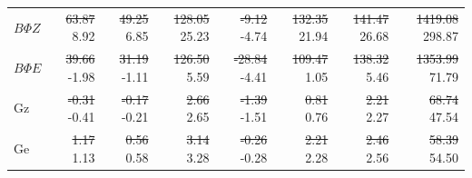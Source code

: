 \documentclass[pdflatex,sn-chicago]{sn-jnl}%
\makeatletter
\theoremstyle{plain}
\theoremstyle{definition}
\theoremstyle{remark}
\theoremstyle{definition}
\providecommand{\DIFaddtex}[1]{{\protect\color{blue}#1}} %
\providecommand{\DIFdeltex}[1]{{\protect\color{red}\sout{#1}}} %
\providecommand{\DIFaddFL}[1]{\DIFadd{#1}} %
\providecommand{\DIFdelFL}[1]{\DIFdel{#1}} %
\providecommand{\DIFaddbeginFL}{} %
\providecommand{\DIFaddendFL}{} %
\providecommand{\DIFdelbeginFL}{} %
\providecommand{\DIFdelendFL}{} %
\providecommand{\DIFadd}[1]{\texorpdfstring{\DIFaddtex{#1}}{#1}} %
\providecommand{\DIFdel}[1]{\texorpdfstring{\DIFdeltex{#1}}{}} %
\let\sout@orig\sout %
\renewcommand{\sout}[1]{\ifmmode\text{\sout@orig{\ensuremath{#1}}}\else\sout@orig{#1}\fi} %
\makeatother
\begin{document}
\begin{table}[!htbp]
\begin{tabular}{lrrrrrrr}
$B\Phi Z$ & \DIFdelbeginFL \DIFdelFL{63.87 }\DIFdelendFL \DIFaddbeginFL \DIFaddFL{8.92 }\DIFaddendFL & \DIFdelbeginFL \DIFdelFL{49.25 }\DIFdelendFL \DIFaddbeginFL \DIFaddFL{6.85 }\DIFaddendFL & \DIFdelbeginFL \DIFdelFL{128.05 }\DIFdelendFL \DIFaddbeginFL \DIFaddFL{25.23 }\DIFaddendFL & \DIFdelbeginFL \DIFdelFL{-9.12 }\DIFdelendFL \DIFaddbeginFL \DIFaddFL{-4.74 }\DIFaddendFL & \DIFdelbeginFL \DIFdelFL{132.35 }\DIFdelendFL \DIFaddbeginFL \DIFaddFL{21.94 }\DIFaddendFL & \DIFdelbeginFL \DIFdelFL{141.47 }\DIFdelendFL \DIFaddbeginFL \DIFaddFL{26.68 }\DIFaddendFL & \DIFdelbeginFL \DIFdelFL{1419.08 }\DIFdelendFL \DIFaddbeginFL \DIFaddFL{298.87 }\DIFaddendFL \\
$B\Phi E$ & \DIFdelbeginFL \DIFdelFL{39.66 }\DIFdelendFL \DIFaddbeginFL \DIFaddFL{-1.98 }\DIFaddendFL & \DIFdelbeginFL \DIFdelFL{31.19 }\DIFdelendFL \DIFaddbeginFL \DIFaddFL{-1.11 }\DIFaddendFL & \DIFdelbeginFL \DIFdelFL{126.50 }\DIFdelendFL \DIFaddbeginFL \DIFaddFL{5.59 }\DIFaddendFL & \DIFdelbeginFL \DIFdelFL{-28.84 }\DIFdelendFL \DIFaddbeginFL \DIFaddFL{-4.41 }\DIFaddendFL & \DIFdelbeginFL \DIFdelFL{109.47 }\DIFdelendFL \DIFaddbeginFL \DIFaddFL{1.05 }\DIFaddendFL & \DIFdelbeginFL \DIFdelFL{138.32 }\DIFdelendFL \DIFaddbeginFL \DIFaddFL{5.46 }\DIFaddendFL & \DIFdelbeginFL \DIFdelFL{1353.99 }\DIFdelendFL \DIFaddbeginFL \DIFaddFL{71.79 }\DIFaddendFL \\
Gz & \DIFdelbeginFL \DIFdelFL{-0.31 }\DIFdelendFL \DIFaddbeginFL \DIFaddFL{-0.41 }\DIFaddendFL & \DIFdelbeginFL \DIFdelFL{-0.17 }\DIFdelendFL \DIFaddbeginFL \DIFaddFL{-0.21 }\DIFaddendFL & \DIFdelbeginFL \DIFdelFL{2.66 }\DIFdelendFL \DIFaddbeginFL \DIFaddFL{2.65 }\DIFaddendFL & \DIFdelbeginFL \DIFdelFL{-1.39 }\DIFdelendFL \DIFaddbeginFL \DIFaddFL{-1.51 }\DIFaddendFL & \DIFdelbeginFL \DIFdelFL{0.81 }\DIFdelendFL \DIFaddbeginFL \DIFaddFL{0.76 }\DIFaddendFL & \DIFdelbeginFL \DIFdelFL{2.21 }\DIFdelendFL \DIFaddbeginFL \DIFaddFL{2.27 }\DIFaddendFL & \DIFdelbeginFL \DIFdelFL{68.74 }\DIFdelendFL \DIFaddbeginFL \DIFaddFL{47.54 }\DIFaddendFL \\
Ge & \DIFdelbeginFL \DIFdelFL{1.17 }\DIFdelendFL \DIFaddbeginFL \DIFaddFL{1.13 }\DIFaddendFL & \DIFdelbeginFL \DIFdelFL{0.56 }\DIFdelendFL \DIFaddbeginFL \DIFaddFL{0.58 }\DIFaddendFL & \DIFdelbeginFL \DIFdelFL{3.14 }\DIFdelendFL \DIFaddbeginFL \DIFaddFL{3.28 }\DIFaddendFL & \DIFdelbeginFL \DIFdelFL{-0.26 }\DIFdelendFL \DIFaddbeginFL \DIFaddFL{-0.28 }\DIFaddendFL & \DIFdelbeginFL \DIFdelFL{2.21 }\DIFdelendFL \DIFaddbeginFL \DIFaddFL{2.28 }\DIFaddendFL & \DIFdelbeginFL \DIFdelFL{2.46 }\DIFdelendFL \DIFaddbeginFL \DIFaddFL{2.56 }\DIFaddendFL & \DIFdelbeginFL \DIFdelFL{58.39 }\DIFdelendFL \DIFaddbeginFL \DIFaddFL{54.50 }\DIFaddendFL \\

\end{tabular}
\end{table}
\end{document}
